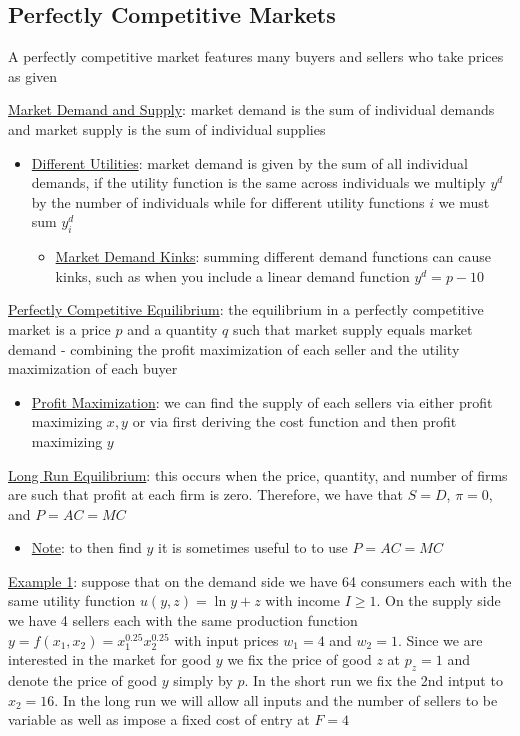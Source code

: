 \documentclass{article}
\begin{document}
\subsection{Perfectly Competitive Markets}
A perfectly competitive market features many buyers and sellers who take prices as given
\par \vspace{0.3em}
  \underline{Market Demand and Supply}: market demand is the sum of individual demands and market supply is the sum of individual supplies
  \begin{itemize}
    \item  \underline{Different Utilities}: market demand is given by the sum of all individual demands, if the utility function is the same across individuals we multiply $y^{d}$ by the number of individuals while for different utility functions $i$ we must sum $y^{d}_{i}$
    \begin{itemize}
      \item  \underline{Market Demand Kinks}: summing different demand functions can cause kinks, such as when you include a linear demand function $y^{d} = p - 10$
    \end{itemize}
  \end{itemize}
  \par
  \underline{Perfectly Competitive Equilibrium}: the equilibrium in a perfectly competitive market is a price $p$ and a quantity $q$ such that market supply equals market demand - combining the profit maximization of each seller and the utility maximization of each buyer
  \begin{itemize}
    \item  \underline{Profit Maximization}: we can find the supply of each sellers via either profit maximizing $x,y$ or via first deriving the cost function and then profit maximizing $y$
  \end{itemize}
  \par
  \underline{Long Run Equilibrium}: this occurs when the price, quantity, and number of firms are such that profit at each firm is zero. Therefore, we have that $S = D$, $\pi = 0$, and $P=AC = MC$
  \begin{itemize}
    \item  \underline{Note}: to then find $y$ it is sometimes useful to to use $P = AC = MC$
  \end{itemize}
  \par
  \underline{Example 1}: suppose that on the demand side we have 64 consumers each with the same utility function $u(y,z) = \ln y + z$ with income $I \geq 1$. On the supply side we have 4 sellers each with the same production function $y = f(x_{1}, x_{2}) = x_{1}^{0.25}x_{2}^{0.25}$ with input prices $w_{1} = 4$ and $w_{2} = 1$. Since we are interested in the market for good $y$ we fix the price of good $z$ at $p_{z} = 1$ and denote the price of good $y$ simply by $p$. In the short run we fix the 2nd intput to $x_{2} = 16$. In the long run we will allow all inputs and the number of sellers to be variable as well as impose a fixed cost of entry at $F = 4$
\end{document}
